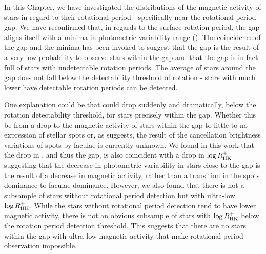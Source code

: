 In this Chapter, we have investigated the distributions of the magnetic activity of stars in regard to their rotational period - specifically near the rotational period gap.
We have reconfirmed that, in regards to the surface rotation period, the gap aligns itself with a minima in photometric variability range (\rper{}).
The coincidence of the gap and the minima has been invoked to suggest that the gap is the result of a very-low probability to observe stars within the gap and that the gap is in-fact full of stars with undetectable rotation periods.
The average \rper{} of stars around the gap does not fall below the detectability threshold of rotation - stars with much lower \rper{} have detectable rotation periods can be detected.

One explanation could be that \rper{} could drop suddenly and dramatically, below the rotation detectability threshold, for stars precisely within the gap.
Whether this be from a drop to the magnetic activity of stars within the gap to little to no expression of stellar spots or, as \citet{reinhold_spot_2018} suggests, the result of the cancellation brightness variations of spots by faculae is currently unknown.
We found in this work that the drop in \rper{}, and thus the gap, is also coincident with a drop in $\log R^{+}_{\rm{HK}}$ suggesting that the decrease in photometric variability in stars close to the gap is the result of a decrease in magnetic activity, rather than a transition in the spots dominance to faculae dominance.
However, we also found that there is not a subsample of stars without rotational period detection but with ultra-low $\log R^{+}_{\rm{HK}}$.
While the stars without rotational period detection tend to have lower magnetic activity, there is not an obvious subsample of stars with $\log R^{+}_{\rm{HK}}$ below the rotation period detection threshold.
This suggests that there are no stars within the gap with ultra-low magnetic activity that make rotational period observation impossible.

